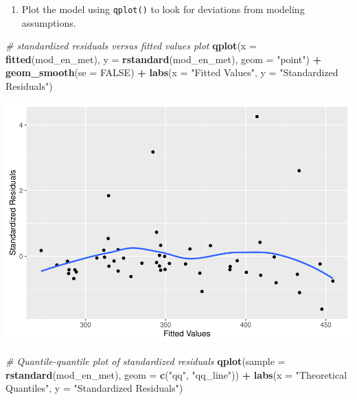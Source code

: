 \documentclass[
]{book}
\newenvironment{Shaded}{\begin{snugshade}}{\end{snugshade}}
\newcommand{\CommentTok}[1]{\textcolor[rgb]{0.56,0.35,0.01}{\textit{#1}}}
\newcommand{\DataTypeTok}[1]{\textcolor[rgb]{0.13,0.29,0.53}{#1}}
\newcommand{\KeywordTok}[1]{\textcolor[rgb]{0.13,0.29,0.53}{\textbf{#1}}}
\newcommand{\NormalTok}[1]{#1}
\newcommand{\OperatorTok}[1]{\textcolor[rgb]{0.81,0.36,0.00}{\textbf{#1}}}
\newcommand{\OtherTok}[1]{\textcolor[rgb]{0.56,0.35,0.01}{#1}}
\newcommand{\StringTok}[1]{\textcolor[rgb]{0.31,0.60,0.02}{#1}}
\providecommand{\tightlist}{%
  \setlength{\itemsep}{0pt}\setlength{\parskip}{0pt}}
\begin{document}
\begin{alert}
\begin{enumerate}
\def\labelenumi{\arabic{enumi}.}
\setcounter{enumi}{2}
\tightlist
\item
  Plot the model using \texttt{qplot()} to look for deviations from modeling assumptions.
\end{enumerate}

\begin{Shaded}
\begin{Highlighting}[]
    \CommentTok{\# standardized residuals versus fitted values plot}
  \KeywordTok{qplot}\NormalTok{(}\DataTypeTok{x =} \KeywordTok{fitted}\NormalTok{(mod\_en\_met), }\DataTypeTok{y =} \KeywordTok{rstandard}\NormalTok{(mod\_en\_met), }\DataTypeTok{geom =} \StringTok{"point"}\NormalTok{) }\OperatorTok{+}
\StringTok{      }\KeywordTok{geom\_smooth}\NormalTok{(}\DataTypeTok{se =} \OtherTok{FALSE}\NormalTok{) }\OperatorTok{+}
\StringTok{      }\KeywordTok{labs}\NormalTok{(}\DataTypeTok{x =} \StringTok{"Fitted Values"}\NormalTok{, }\DataTypeTok{y =} \StringTok{"Standardized Residuals"}\NormalTok{)}
\end{Highlighting}
\end{Shaded}

\includegraphics{R/Rmodels/figures/unnamed-chunk-102-1.pdf}

\begin{Shaded}
\begin{Highlighting}[]
  \CommentTok{\# Quantile{-}quantile plot of standardized residuals}
  \KeywordTok{qplot}\NormalTok{(}\DataTypeTok{sample =} \KeywordTok{rstandard}\NormalTok{(mod\_en\_met), }\DataTypeTok{geom =} \KeywordTok{c}\NormalTok{(}\StringTok{"qq"}\NormalTok{, }\StringTok{"qq\_line"}\NormalTok{)) }\OperatorTok{+}\StringTok{ }
\StringTok{      }\KeywordTok{labs}\NormalTok{(}\DataTypeTok{x =} \StringTok{"Theoretical Quantiles"}\NormalTok{, }\DataTypeTok{y =} \StringTok{"Standardized Residuals"}\NormalTok{)}
\end{Highlighting}
\end{Shaded}


\end{alert}
\end{document}
